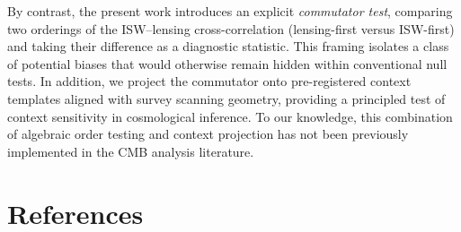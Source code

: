 \documentclass[11pt]{article}
\begin{document}
By contrast, the present work introduces an explicit \emph{commutator test}, comparing two orderings of the ISW--lensing cross-correlation (lensing-first versus ISW-first) and taking their difference as a diagnostic statistic. This framing isolates a class of potential biases that would otherwise remain hidden within conventional null tests. In addition, we project the commutator onto pre-registered context templates aligned with survey scanning geometry, providing a principled test of context sensitivity in cosmological inference. To our knowledge, this combination of algebraic order testing and context projection has not been previously implemented in the CMB analysis literature.

\section*{References}
\end{document}
